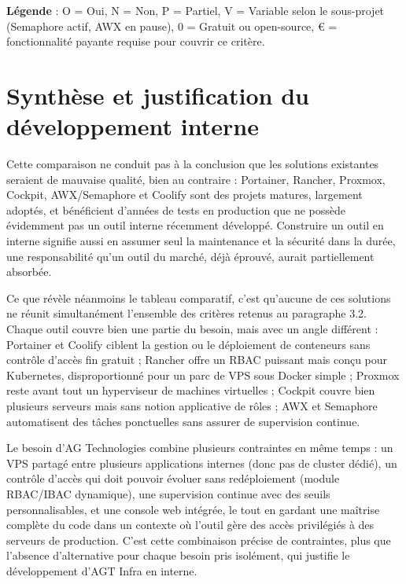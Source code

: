 \begin{flushleft}
\footnotesize
\textbf{Légende} : O = Oui, N = Non, P = Partiel, V = Variable selon le
sous-projet (Semaphore actif, AWX en pause), 0 = Gratuit ou open-source,
€ = fonctionnalité payante requise pour couvrir ce critère.
\end{flushleft}

\section{Synthèse et justification du développement interne}

Cette comparaison ne conduit pas à la conclusion que les solutions
existantes seraient de mauvaise qualité, bien au contraire : Portainer,
Rancher, Proxmox, Cockpit, AWX/Semaphore et Coolify sont des projets
matures, largement adoptés, et bénéficient d'années de tests en production
que ne possède évidemment pas un outil interne récemment développé. Construire un outil en
interne signifie aussi en assumer seul la maintenance et la sécurité dans
la durée, une responsabilité qu'un outil du marché, déjà éprouvé, aurait
partiellement absorbée.

Ce que révèle néanmoins le tableau comparatif, c'est qu'aucune de ces
solutions ne réunit simultanément l'ensemble des critères retenus au
paragraphe 3.2. Chaque outil couvre bien une partie du besoin, mais avec un
angle différent : Portainer et Coolify ciblent la gestion ou le déploiement
de conteneurs sans contrôle d'accès fin gratuit ; Rancher offre un RBAC
puissant mais conçu pour Kubernetes, disproportionné pour un parc de VPS
sous Docker simple ; Proxmox reste avant tout un hyperviseur de machines
virtuelles ; Cockpit couvre bien plusieurs serveurs mais sans notion
applicative de rôles ; AWX et Semaphore automatisent des tâches
ponctuelles sans assurer de supervision continue.

Le besoin d'AG Technologies combine plusieurs contraintes en même temps :
un VPS partagé entre plusieurs applications internes (donc pas de cluster
dédié), un contrôle d'accès qui doit pouvoir évoluer sans redéploiement
(module RBAC/IBAC dynamique), une supervision continue avec des seuils
personnalisables, et une console web intégrée, le tout en gardant une
maîtrise complète du code dans un contexte où l'outil gère des accès
privilégiés à des serveurs de production. C'est cette combinaison précise
de contraintes, plus que l'absence d'alternative pour chaque besoin pris
isolément, qui justifie le développement d'AGT Infra en interne.